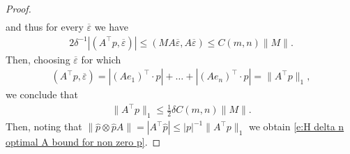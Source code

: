 \documentclass[10pt,a4paper]{amsart}
\begin{document}
\begin{proof}
\begin{align*}
\end{align*}
and thus for every $\overline \varepsilon$ we have
\begin{align*}
  2\delta^{-1}|(A^\top p,\overline \varepsilon)| \leq (MA\overline \varepsilon, A\overline \varepsilon) \leq C(m,n)\|M\|.
\end{align*}
Then, choosing $\overline \varepsilon$ for which
\begin{align*}
  (A^\top p,\overline \varepsilon)= |(Ae_1)^\top\cdot p| + \ldots + |(Ae_n)^\top\cdot p| = \|A^\top p\|_1,   
\end{align*}
we conclude that 
\begin{align*}
  \|A^\top p\|_1 \leq \tfrac{1}{2}\delta C(m,n)\|M\|.      
\end{align*}
Then, noting that $\|\hat p \otimes \hat p A\| =| A^\top \hat p| \leq |p|^{-1}\| A^\top  p\|_1$ we obtain \eqref{e:H delta n optimal A bound for non zero p}.


\end{proof}
\end{document}
